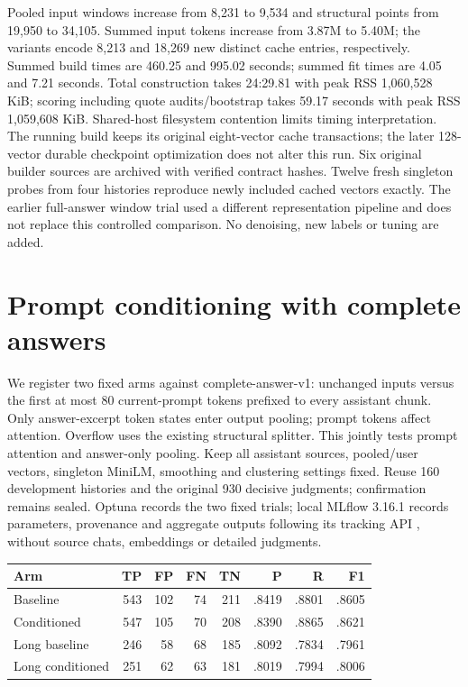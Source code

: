 \documentclass[11pt]{article}
\begin{document}
Pooled input windows increase from 8,231 to 9,534 and structural points from
19,950 to 34,105. Summed input tokens increase from 3.87M to 5.40M; the variants
encode 8,213 and 18,269 new distinct cache entries, respectively. Summed build
times are 460.25 and 995.02 seconds; summed fit times are 4.05 and 7.21 seconds.
Total construction takes 24:29.81 with peak RSS 1,060,528 KiB; scoring including
quote audits/bootstrap takes 59.17 seconds with peak RSS 1,059,608 KiB.
Shared-host filesystem contention limits timing interpretation. The running build
keeps its original eight-vector cache transactions; the later 128-vector durable
checkpoint optimization does not alter this run. Six original builder sources
are archived with verified contract hashes. Twelve fresh singleton probes from
four histories reproduce newly included cached vectors exactly. The earlier
full-answer window trial used a different representation pipeline and does not
replace this controlled comparison. No denoising, new labels or tuning are added.

\section{Prompt conditioning with complete answers}
We register two fixed arms against complete-answer-v1: unchanged inputs versus
the first at most 80 current-prompt tokens prefixed to every assistant chunk.
Only answer-excerpt token states enter output pooling; prompt tokens affect
attention. Overflow uses the existing structural splitter. This jointly tests
prompt attention and answer-only pooling. Keep all assistant sources, pooled/user
vectors, singleton MiniLM, smoothing and clustering settings fixed. Reuse 160
development histories and the original 930 decisive judgments; confirmation
remains sealed. Optuna records the two fixed trials; local MLflow 3.16.1 records
parameters, provenance and aggregate outputs following its tracking API
\cite{mlflowtracking}, without source chats, embeddings or detailed judgments.

\begin{center}
\begin{tabular}{lrrrrrrr}
Arm & TP & FP & FN & TN & P & R & F1\\\hline
Baseline & 543 & 102 & 74 & 211 & .8419 & .8801 & .8605\\
Conditioned & 547 & 105 & 70 & 208 & .8390 & .8865 & .8621\\
Long baseline & 246 & 58 & 68 & 185 & .8092 & .7834 & .7961\\
Long conditioned & 251 & 62 & 63 & 181 & .8019 & .7994 & .8006\\
\end{tabular}
\end{center}
\end{document}
